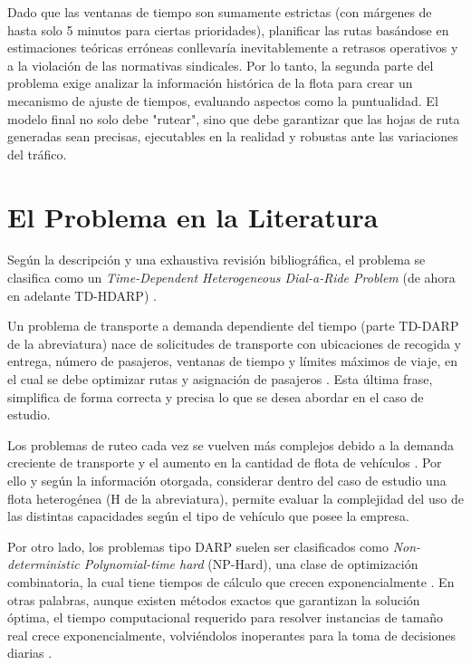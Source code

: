 Dado que las ventanas de tiempo son sumamente estrictas (con márgenes de hasta solo 5 minutos para ciertas prioridades), planificar las rutas basándose en estimaciones teóricas erróneas conllevaría inevitablemente a retrasos operativos y a la violación de las normativas sindicales. Por lo tanto, la segunda parte del problema exige analizar la información histórica de la flota para crear un mecanismo de ajuste de tiempos, evaluando aspectos como la puntualidad. El modelo final no solo debe "rutear", sino que debe garantizar que las hojas de ruta generadas sean precisas, ejecutables en la realidad y robustas ante las variaciones del tráfico.






\section{El Problema en la Literatura}

Según la descripción y una exhaustiva revisión bibliográfica, el problema se clasifica como un \textit{Time-Dependent Heterogeneous Dial-a-Ride Problem} (de ahora en adelante TD-HDARP) \cite{Ho2018, Parragh2011}.

Un problema de transporte a demanda dependiente del tiempo (parte TD-DARP de la abreviatura) nace de solicitudes de transporte con ubicaciones de recogida y entrega, número de pasajeros, ventanas de tiempo y límites máximos de viaje, en el cual se debe optimizar rutas y asignación de pasajeros \cite{Gaul2025}. Esta última frase, simplifica de forma correcta y precisa lo que se desea abordar en el caso de estudio.

Los problemas de ruteo cada vez se vuelven más complejos debido a la demanda creciente de transporte y el aumento en la cantidad de flota de vehículos \cite{Gaul2025}. Por ello y según la información otorgada, considerar dentro del caso de estudio una flota heterogénea (H de la abreviatura), permite evaluar la complejidad del uso de las distintas capacidades según el tipo de vehículo que posee la empresa.

Por otro lado, los problemas tipo DARP suelen ser clasificados como \textit{Non-deterministic Polynomial-time hard} (NP-Hard), una clase de optimización combinatoria, la cual tiene tiempos de cálculo que crecen exponencialmente \cite{TaylorFrancisNPHard}. En otras palabras, aunque existen métodos exactos que garantizan la solución óptima, el tiempo computacional requerido para resolver instancias de tamaño real crece exponencialmente, volviéndolos inoperantes para la toma de decisiones diarias \cite{Izadkhah2022}.





